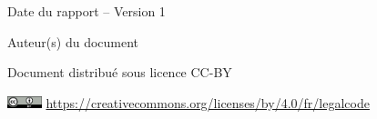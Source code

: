\begin{titlepage}
\hspace{-1cm}\textcolor{inrae}{\sffamily Date du rapport -- Version 1}\par

\vspace*{1cm}

\hspace{-1cm}\textcolor{inraefonce}{\sffamily Auteur(s) du document}\par

\hspace{-1cm}\textcolor{inraefonce}{\sffamily
Document distribué sous licence CC-BY}\par

\hspace{-1cm}\includegraphics[width=1cm]{templates/cc-by} \href{https://creativecommons.org/licenses/by/4.0/fr/legalcode}{https://creativecommons.org/licenses/by/4.0/fr/legalcode}

\restoregeometry

\end{titlepage}
